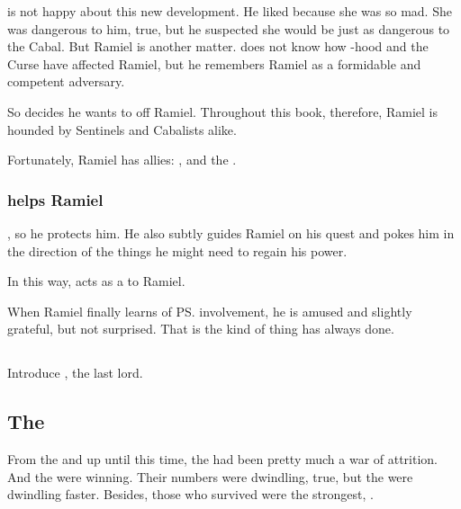 \Secherdamon{} is not happy about this new development. 
He liked \Shiaraid{} because she was so mad. 
She was dangerous to him, true, but he suspected she would be just as dangerous to the Cabal. 
But Ramiel is another matter. 
\Secherdamon{} does not know how \malach-hood and the Curse have affected Ramiel, but he remembers Ramiel as a formidable and competent adversary. 

So \Secherdamon{} decides he wants to off Ramiel. 
Throughout this book, therefore, Ramiel is hounded by Sentinels and Cabalists alike. 

Fortunately, Ramiel has allies: 
\Cishiel, \Azraid{} and the \vorcanths. 





\subsubsection{\Azraid{} helps Ramiel}
\Azraid{} , so he protects him. 
He also subtly guides Ramiel on his quest and pokes him in the direction of the things he might need to regain his power. 

In this way, \Azraid{} acts as a  to Ramiel. 

When Ramiel finally learns of \ps{\Azraid} involvement, he is amused and slightly grateful, but not surprised. 
That is the kind of thing \Azraid{} has always done. 








\subsection{\Sithiyacaan}
Introduce , the last  lord. 







\subsection{The \Feud}
From the \Shrouding{} and up until this time, the \feud{} had been pretty much a war of attrition. 
And the \resphain{} were winning. 
Their numbers were dwindling, true, but the \dragons{} were dwindling faster. 
Besides, those \resphain{} who survived were the strongest, . 







